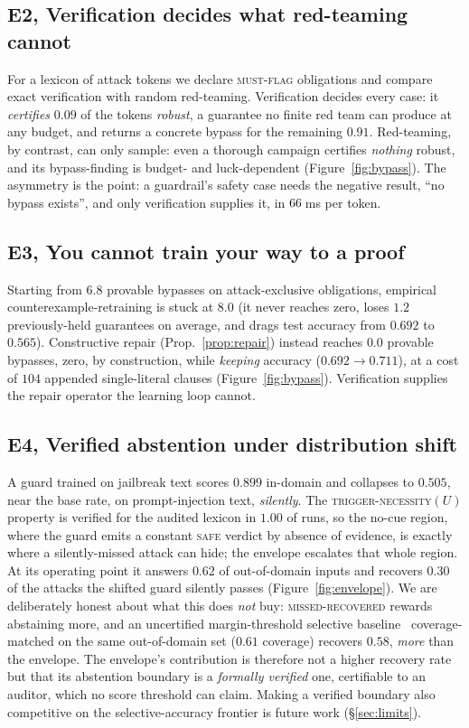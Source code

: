 \documentclass[11pt]{article}
\newcommand{\robustFrac}{0.09}\newcommand{\bypassFrac}{0.91}
\newcommand{\bypInit}{6.8}\newcommand{\bypEmp}{8.0}\newcommand{\bypCon}{0.0}
\newcommand{\accInit}{0.692}\newcommand{\accEmp}{0.565}\newcommand{\accCon}{0.711}
\newcommand{\clausesAdded}{104}\newcommand{\lostGuar}{1.2}
\newcommand{\plainIn}{0.899}\newcommand{\plainOut}{0.505}
\newcommand{\missEnv}{0.30}\newcommand{\missBase}{0.12}
\newcommand{\soundRate}{1.00}\newcommand{\covEnv}{0.62}\newcommand{\covBase}{0.94}
\newcommand{\missBaseM}{0.58}\newcommand{\covBaseM}{0.61}
\begin{document}
\subsection{E2, Verification decides what red-teaming cannot}
For a lexicon of attack tokens we declare \textsc{must-flag} obligations and compare
exact verification with random red-teaming. Verification decides every case: it
\emph{certifies} $\robustFrac$ of the tokens \emph{robust}, a guarantee no finite
red team can produce at any budget, and returns a concrete bypass for the
remaining $\bypassFrac$. Red-teaming, by contrast, can only sample: even a thorough
campaign certifies \emph{nothing} robust, and its bypass-finding is budget- and
luck-dependent (Figure~\ref{fig:bypass}). The asymmetry is the point: a guardrail's
safety case needs the negative result, ``no bypass exists'', and only
verification supplies it, in $66$\,ms per token.

\subsection{E3, You cannot train your way to a proof}
Starting from $\bypInit$ provable bypasses on attack-exclusive obligations,
empirical counterexample-retraining is stuck at $\bypEmp$ (it never reaches zero,
loses $\lostGuar$ previously-held guarantees on average, and drags test accuracy
from $\accInit$ to $\accEmp$). Constructive repair (Prop.~\ref{prop:repair}) instead
reaches $\bypCon$ provable bypasses, zero, by construction, while \emph{keeping}
accuracy ($\accInit\to\accCon$), at a cost of $\clausesAdded$ appended single-literal
clauses (Figure~\ref{fig:bypass}). Verification supplies the repair operator the
learning loop cannot.

\subsection{E4, Verified abstention under distribution shift}
A guard trained on jailbreak text scores $\plainIn$ in-domain and collapses to
$\plainOut$, near the base rate, on prompt-injection text, \emph{silently}. The
\textsc{trigger-necessity}$(U)$ property is verified for the audited lexicon in
$\soundRate$ of runs, so the no-cue region, where the guard emits a constant
\textsc{safe} verdict by absence of evidence, is exactly where a silently-missed
attack can hide; the envelope escalates that whole region. At its operating point
it answers $\covEnv$ of out-of-domain inputs and recovers $\missEnv$ of the attacks
the shifted guard silently passes (Figure~\ref{fig:envelope}). We are deliberately
honest about what this does \emph{not} buy: \textsc{missed-recovered} rewards
abstaining more, and an uncertified margin-threshold selective
baseline~\citep{geifman2017selective} coverage-matched on the same out-of-domain
set ($\covBaseM$ coverage) recovers $\missBaseM$, \emph{more} than the envelope.
The envelope's contribution is therefore not a higher recovery rate but that its
abstention boundary is a \emph{formally verified} one, certifiable to an auditor,
which no score threshold can claim. Making a verified boundary also competitive on
the selective-accuracy frontier is future work (\S\ref{sec:limits}).
\end{document}
